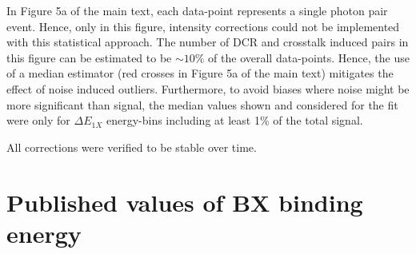 \documentclass[journal=nalefd, manuscript=letter, layout=twocolumn]{achemso}
\begin{document}
In Figure 5a of the main text, each data-point represents a single photon pair event. Hence, only in this figure, intensity corrections could not be implemented with this statistical approach. The number of DCR and crosstalk induced pairs in this figure can be estimated to be ${\sim}10\%$ of the overall data-points. Hence, the use of a median estimator (red crosses in Figure 5a of the main text) mitigates the effect of noise induced outliers. Furthermore, to avoid biases where noise might be more significant than signal, the median values shown and considered for the fit were only for $\Delta E_{1X}$ energy-bins including at least 1\% of the total signal.

All corrections were verified to be stable over time.

\section{Published values of BX binding energy}
\end{document}
